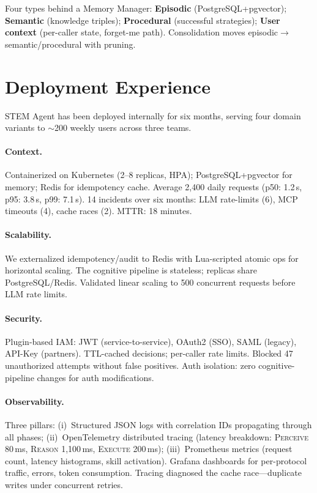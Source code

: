 \documentclass[11pt]{article}
\begin{document}
Four types behind a Memory Manager: \textbf{Episodic} (PostgreSQL+pgvector); \textbf{Semantic} (knowledge triples); \textbf{Procedural} (successful strategies); \textbf{User context} (per-caller state, forget-me path). Consolidation moves episodic$\to$semantic/procedural with pruning.

\section{Deployment Experience}
\label{sec:deployment}

STEM Agent has been deployed internally for six months, serving four domain variants to $\sim$200 weekly users across three teams.

\paragraph{Context.}
Containerized on Kubernetes (2--8 replicas, HPA); PostgreSQL+pgvector for memory; Redis for idempotency cache. Average 2,400 daily requests (p50: 1.2\,s, p95: 3.8\,s, p99: 7.1\,s). 14 incidents over six months: LLM rate-limits (6), MCP timeouts (4), cache races (2). MTTR: 18 minutes.

\paragraph{Scalability.}
We externalized idempotency/audit to Redis with Lua-scripted atomic ops for horizontal scaling. The cognitive pipeline is stateless; replicas share PostgreSQL/Redis. Validated linear scaling to 500 concurrent requests before LLM rate limits.

\paragraph{Security.}
Plugin-based IAM: JWT (service-to-service), OAuth2 (SSO), SAML (legacy), API-Key (partners). TTL-cached decisions; per-caller rate limits. Blocked 47 unauthorized attempts without false positives. Auth isolation: zero cognitive-pipeline changes for auth modifications.

\paragraph{Observability.}
Three pillars: (i)~Structured JSON logs with correlation IDs propagating through all phases; (ii)~OpenTelemetry distributed tracing (latency breakdown: \textsc{Perceive} 80\,ms, \textsc{Reason} 1,100\,ms, \textsc{Execute} 200\,ms); (iii)~Prometheus metrics (request count, latency histograms, skill activation). Grafana dashboards for per-protocol traffic, errors, token consumption. Tracing diagnosed the cache race---duplicate writes under concurrent retries.
\end{document}
